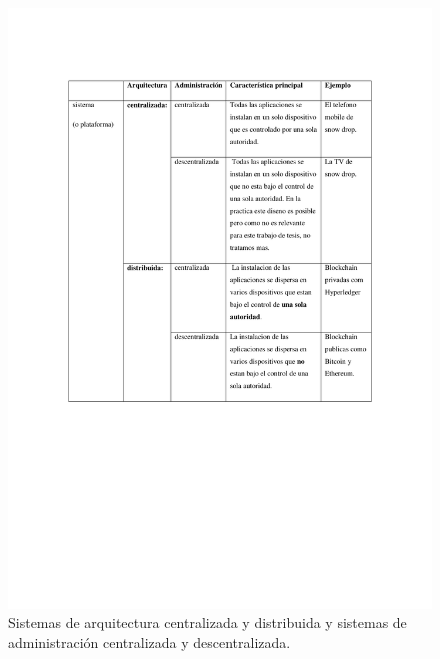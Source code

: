 \documentclass[12pt]{report} %
\begin{document}
\begin{figure}
\centering
\includegraphics[width=0.85\columnwidth]{imagenes/imagendesc7).pdf}
\caption{Sistemas de arquitectura centralizada y distribuida y sistemas  de administración centralizada y descentralizada.}
\label{imagendesc7).pdf}
\end{figure} 
\end{document}
